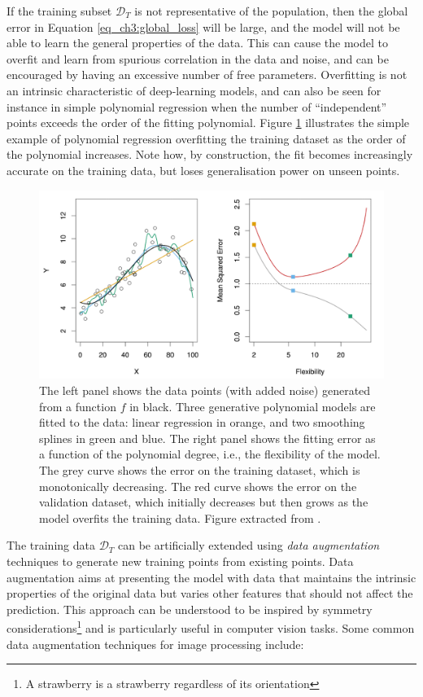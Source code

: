 If the training subset $\mathcal{D}_T$ is not representative of the population, then the global error in Equation \ref{eq_ch3:global_loss} will be large, and the model will not be able to learn the general properties of the data.
This can cause the model to overfit and learn from spurious correlation in the data and noise, and can be encouraged by having an excessive number of free parameters.
Overfitting is not an intrinsic characteristic of deep-learning models, and can also be seen for instance in simple polynomial regression when the number of ``independent'' points exceeds the order of the fitting polynomial.
Figure \ref{fig:ML overfit poly} illustrates the simple example of polynomial regression overfitting the training dataset as the order of the polynomial increases. Note how, by construction, the fit becomes increasingly accurate on the training data, but loses generalisation power on unseen points.
\begin{figure}
    \centering
    \includegraphics[width=0.7\linewidth]{img/ML/poly_overfit.png}
    \caption{The left panel shows the data points (with added noise) generated from a function $f$ in black. Three generative polynomial models are fitted to the data: linear regression in orange, and two smoothing splines in green and blue. The right panel shows the fitting error as a function of the polynomial degree, i.e., the flexibility of the model. The grey curve shows the error on the training dataset, which is monotonically decreasing. The red curve shows the error on the validation dataset, which initially decreases but then grows as the model overfits the training data. Figure extracted from \cite{James2021}. }
    \label{fig:ML overfit poly}
\end{figure}

The training data $\mathcal{D}_T$ can be artificially extended using \emph{data augmentation} techniques \cite{data_augmentation} to generate new training points from existing points. Data augmentation aims at presenting the model with data that maintains the intrinsic properties of the original data but varies other features that should not affect the prediction. This approach can be understood to be inspired by symmetry considerations\footnote{A strawberry is a strawberry regardless of its orientation} and is particularly useful in computer vision tasks. Some common data augmentation techniques for image processing include:

